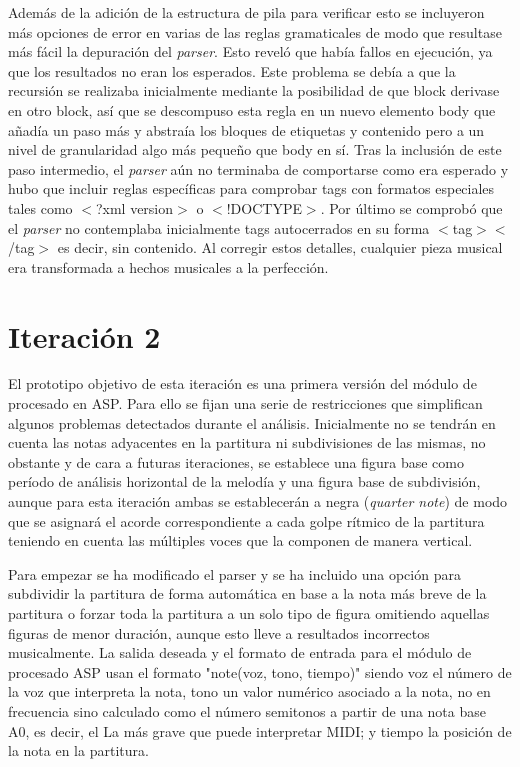 Además de la adición de la estructura de pila para verificar esto se incluyeron más opciones de error en varias de las reglas gramaticales de modo que resultase más fácil la depuración del \textit{parser}. Esto reveló que había fallos en ejecución, ya que los resultados no eran los esperados. Este problema se debía a que la recursión se realizaba inicialmente mediante la posibilidad de que block derivase en otro block, así que se descompuso esta regla en un nuevo elemento body que añadía un paso más y abstraía los bloques de etiquetas y contenido pero a un nivel de granularidad algo más pequeño que body en sí. Tras la inclusión de este paso intermedio, el \textit{parser} aún no terminaba de comportarse como era esperado y hubo que incluir reglas específicas para comprobar tags con formatos especiales tales como $<$?xml version$>$ o $<$!DOCTYPE$>$. Por último se comprobó que el \textit{parser} no contemplaba inicialmente tags autocerrados en su forma $<$tag$>$$<$/tag$>$ es decir, sin contenido. Al corregir estos detalles, cualquier pieza musical era transformada a hechos musicales a la perfección.

\section{Iteración 2}

El prototipo objetivo de esta iteración es una primera versión del módulo de procesado en ASP. Para ello se fijan una serie de restricciones que simplifican algunos problemas detectados durante el análisis. Inicialmente no se tendrán en cuenta las notas adyacentes en la partitura ni subdivisiones de las mismas, no obstante y de cara a futuras iteraciones, se establece una figura base como período de análisis horizontal de la melodía y una figura base de subdivisión, aunque para esta iteración ambas se establecerán a negra (\textit{quarter note}) de modo que se asignará el acorde correspondiente a cada golpe rítmico de la partitura teniendo en cuenta las múltiples voces que la componen de manera vertical.

Para empezar se ha modificado el parser y se ha incluido una opción para subdividir la partitura de forma automática en base a la nota más breve de la partitura o forzar toda la partitura a un solo tipo de figura omitiendo aquellas figuras de menor duración, aunque esto lleve a resultados incorrectos musicalmente. La salida deseada y el formato de entrada para el módulo de procesado ASP usan el formato "note(voz, tono, tiempo)" siendo voz el número de la voz que interpreta la nota, tono un valor numérico asociado a la nota, no en frecuencia sino calculado como el número semitonos a partir de una nota base A0, es decir, el La más grave que puede interpretar MIDI; y tiempo la posición de la nota en la partitura.

